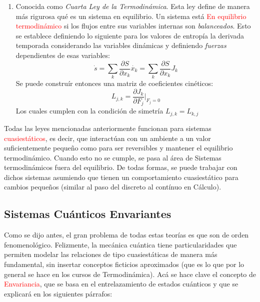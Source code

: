\documentclass{book}
\begin{document}
\begin{enumerate}
    \item Conocida como \textit{Cuarta Ley de la Termodinámica}. Esta ley define de manera más rigurosa qué es un sistema en equilibrio. Un sistema está \textcolor{red}{En equilibrio termodinámico} si los flujos entre sus variables internas son \textit{balanceados}. Esto se establece definiendo lo siguiente para los valores de entropía la derivada temporada considerando las variables dinámicas y definiendo \textit{fuerzas} dependientes de esas variables: 
    \begin{equation}\label{eq3.5}{\dot{s}=\sum_k\frac{\partial S}{\partial x_k}\dot{x_k}=\sum_k\frac{\partial S}{\partial x_k}J_k}\end{equation}
    Se puede construír entonces una matriz de coeficientes cinéticos:
    \begin{equation}\label{eq3.6}{L_{j,k}=\frac{\partial J_k}{\partial F_j}\rvert_{F_j=0}}\end{equation}
    Los cuales cumplen con la condición de simetría ${L_{j,k}=L_{k,j}}$
\end{enumerate}
    Todas las leyes mencionadas anteriormente funcionan para sistemas \textcolor{red}{cuasiestáticos}, es decir, que interactúan con un ambiente a un valor suficientemente pequeño como para ser reversibles y mantener el equilibrio termodinámico. Cuando esto no se cumple, se pasa al área de Sistemas termodinámicos fuera del equilibrio. De todas formas, se puede trabajar con dichos sistemas asumiendo que tienen un comportamiento cuasiestático para cambios pequeños (similar al paso del discreto al contínuo en Cálculo).
\subsection{Sistemas Cuánticos Envariantes}
    Como se dijo antes, el gran problema de todas estas teorías es que son de orden fenomenológico. Felizmente, la mecánica cuántica tiene particularidades que permiten modelar las relaciones de tipo cuasiestáticas de manera más fundamental, sin insertar conceptos ficticios aproximados (que es lo que por lo general se hace en los cursos de Termodinámica). Acá se hace clave el concepto de \textcolor{red}{Envariancia}, que se basa en el entrelazamiento de estados cuánticos y que se explicará en los siguientes párrafos:
    
\end{document}

